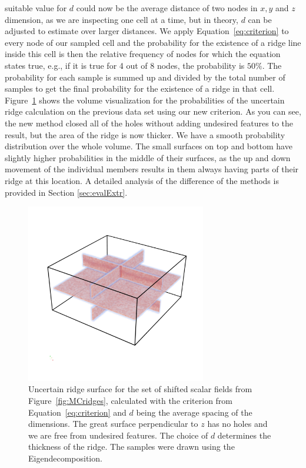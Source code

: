 suitable value for $d$ could now be the average distance of two nodes in
$x, y$ and $z$ dimension, as we are inspecting one cell at a time, but
in theory, $d$ can be adjusted to estimate over larger distances. We
apply Equation~\ref{eq:criterion} to every node of our sampled cell and
the probability for the existence of a ridge line inside this cell is
then the relative frequency of nodes for which the equation states true,
e.g., if it is true for 4 out of 8 nodes, the probability is $50\%$.
The probability for each sample is summed up and divided by the total
number of samples to get the final probability for the existence of a
ridge in that cell.\\
\indent Figure~\ref{fig:newmethod} shows the volume visualization for
the probabilities of the uncertain ridge calculation on the previous
data set using our new criterion. As you can see, the new method closed
all of the holes without adding undesired features to the result, but
the area of the ridge is now thicker. We have a smooth probability
distribution over the whole volume. The small surfaces on top and bottom
have slightly higher probabilities in the middle of their surfaces, as
the up and down movement of the individual members results in them
always having parts of their ridge at this location. A detailed analysis
of the difference of the methods is provided in Section
\ref{sec:evalExtr}.

\begin{figure}[]
    \centering
    \includegraphics[trim=0 350 0 300, clip=true, width=0.7\textwidth]{Images/lowuncnew.png}
    \caption{Uncertain ridge surface for the set of shifted scalar
    fields from Figure~\ref{fig:MCridges}, calculated with the criterion
    from Equation~\ref{eq:criterion} and $d$ being the average spacing
    of the dimensions. The great surface perpendicular to $z$ has no
    holes and we are free from undesired features. The choice of $d$
    determines the thickness of the ridge. The samples were drawn using
    the Eigendecomposition.}
    \label{fig:newmethod}
\end{figure}

